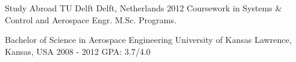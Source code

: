 \begin{cventries}
  \cveduentry
    {Study Abroad} %
    {}
    {TU Delft} %
    {Delft, Netherlands} %
    {2012} %
    {Coursework in Systems \& Control and Aerospace Engr. M.Sc. Programs.}
    
  \cveduentry
    {Bachelor of Science in Aerospace Engineering} %
    {}
    {University of Kansas} %
    {Lawrence, Kansas, USA} %
    {2008 - 2012} %
    {GPA: 3.7/4.0}
\end{cventries}
